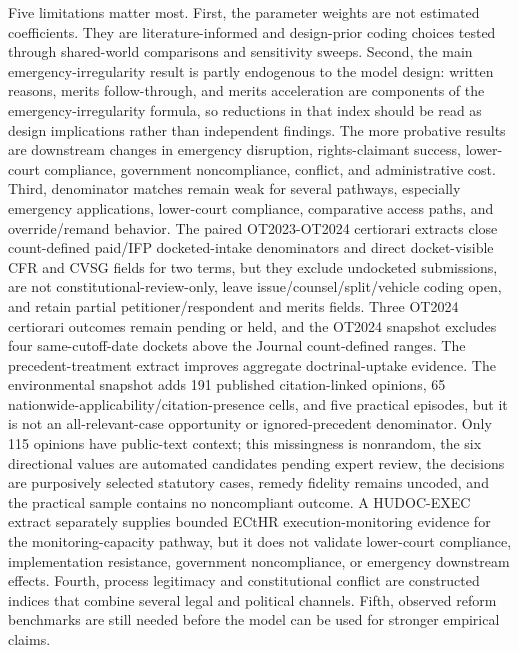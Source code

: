\documentclass[
    journal=jlc,
    manuscript=research-article,
    year=2026,
  ]{cup-journal}
\begin{document}
Five limitations matter most. First, the parameter weights are not estimated coefficients. They are literature-informed and design-prior coding choices tested through shared-world comparisons and sensitivity sweeps. Second, the main emergency-irregularity result is partly endogenous to the model design: written reasons, merits follow-through, and merits acceleration are components of the emergency-irregularity formula, so reductions in that index should be read as design implications rather than independent findings. The more probative results are downstream changes in emergency disruption, rights-claimant success, lower-court compliance, government noncompliance, conflict, and administrative cost. Third, denominator matches remain weak for several pathways, especially emergency applications, lower-court compliance, comparative access paths, and override/remand behavior. The paired OT2023-OT2024 certiorari extracts close count-defined paid/IFP docketed-intake denominators and direct docket-visible CFR and CVSG fields for two terms, but they exclude undocketed submissions, are not constitutional-review-only, leave issue/counsel/split/vehicle coding open, and retain partial petitioner/respondent and merits fields. Three OT2024 certiorari outcomes remain pending or held, and the OT2024 snapshot excludes four same-cutoff-date dockets above the Journal count-defined ranges. The precedent-treatment extract improves aggregate doctrinal-uptake evidence. The environmental snapshot adds 191 published citation-linked opinions, 65 nationwide-applicability/citation-presence cells, and five practical episodes, but it is not an all-relevant-case opportunity or ignored-precedent denominator. Only 115 opinions have public-text context; this missingness is nonrandom, the six directional values are automated candidates pending expert review, the decisions are purposively selected statutory cases, remedy fidelity remains uncoded, and the practical sample contains no noncompliant outcome. A HUDOC-EXEC extract separately supplies bounded ECtHR execution-monitoring evidence for the monitoring-capacity pathway, but it does not validate lower-court compliance, implementation resistance, government noncompliance, or emergency downstream effects. Fourth, process legitimacy and constitutional conflict are constructed indices that combine several legal and political channels. Fifth, observed reform benchmarks are still needed before the model can be used for stronger empirical claims.
\end{document}
